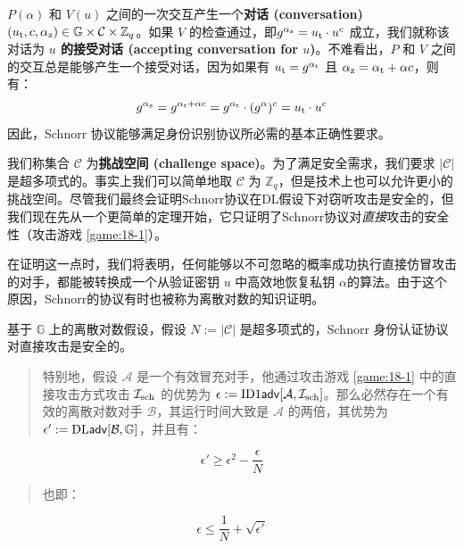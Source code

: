 $P(\alpha)$ 和 $V(u)$ 之间的一次交互产生一个\textbf{对话 (conversation)} $(u_{\rm t},c,\alpha_{\rm z})\in \mathbb{G}\times \mathcal{C}\times \mathbb{Z}_q$。如果 $V$ 的检查通过，即$g^{\alpha_{\rm z}}=u_{\rm t}\cdot u^c$ 成立，我们就称该对话为 \textbf{$u$ 的接受对话 (accepting conversation for $u$)}。不难看出，$P$ 和 $V$ 之间的交互总是能够产生一个接受对话，因为如果有 $u_{\rm t}=g^{\alpha_{\rm t}}$ 且 $\alpha_{\rm z}=\alpha_{\rm t}+\alpha c$，则有：
$$g^{\alpha_{\rm z}}=g^{\alpha_{\rm t}+\alpha c}=g^{\alpha_{\rm t}}\cdot (g^\alpha)^c=u_{\rm t}\cdot u^c$$
因此，Schnorr 协议能够满足身份识别协议所必需的基本正确性要求。

我们称集合 $\mathcal{C}$ 为\textbf{挑战空间 (challenge space)}。为了满足安全需求，我们要求 $|\mathcal{C}|$ 是超多项式的。事实上我们可以简单地取 $\mathcal{C}$ 为 $\mathbb{Z}_q$，但是技术上也可以允许更小的挑战空间。尽管我们最终会证明Schnorr协议在DL假设下对窃听攻击是安全的，但我们现在先从一个更简单的定理开始，它只证明了Schnorr协议对\emph{直接}攻击的安全性（攻击游戏 \ref{game:18-1}）。

在证明这一点时，我们将表明，任何能够以不可忽略的概率成功执行直接仿冒攻击的对手，都能被转换成一个从验证密钥 $u$ 中高效地恢复私钥 $\alpha$的算法。由于这个原因，Schnorr的协议有时也被称为离散对数的知识证明。

\begin{theorem}\label{theo:19-1}
	基于 $\mathbb{G}$ 上的离散对数假设，假设 $N:=|\mathcal{C}|$ 是超多项式的，Schnorr 身份认证协议对直接攻击是安全的。
	\begin{quote}
		特别地，假设 $\mathcal{A}$ 是一个有效冒充对手，他通过攻击游戏 \ref{game:18-1} 中的直接攻击方式攻击 $\mathcal{I}_{\rm sch}$ 的优势为 $\epsilon:={\rm ID1\mathsf{adv}}[\mathcal{A},\mathcal{I}_{\rm sch}]$。那么必然存在一个有效的离散对数对手 $\mathcal{B}$，其运行时间大致是 $\mathcal{A}$ 的两倍，其优势为 $\epsilon':={\rm DL\mathsf{adv}}[\mathcal{B},\mathbb{G}]$，并且有：
	\end{quote}
	\begin{equation}\label{eq:19-1}
		\epsilon'\geq \epsilon^2-\frac{\epsilon}{N}
	\end{equation}
	\begin{quote}
		也即：
	\end{quote}
	\begin{equation}\label{eq:19-2}
		\epsilon\leq\frac{1}{N}+\sqrt{\epsilon'}
	\end{equation}
\end{theorem}

